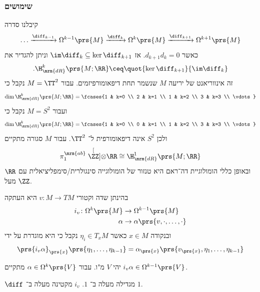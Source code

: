 \documentclass[a4paper,10pt,twoside,openany]{book}
\begin{document}
\subsubsection{שימושים}
קיבלנו סדרה
\[\ldots \xrightarrow{\diff_{k-1}} \Omega^{k-1}\prs{M} \xrightarrow{\diff_k} \Omega^k \prs{M} \xrightarrow{\diff_{k+1}} \Omega^{k+1}\prs{M}\]
כאשר
$d_{k+1} d_k = 0$.
אז
$\im \diff_k \subseteq \ker \diff_{k+1}$
וניתן להגדיר את
\[\text{.} \H_{\mrm{dR}}^k \prs{M ; \RR} \ceq \quot{\ker \diff_{k+1}}{\im \diff_k}\]
זה אינווריאנט של יריעה
$M$
שנשמר תחת דיפאומורפיזמים.
עבור
$M = \TT^2$
נקבל כי
\[\dim \H_{\mrm{dR}}^k \prs{M ; \RR} = \fcases{1 & k=0 \\ 2 & k=1 \\ 1 & k=2 \\ 3 & k=3 \\ \vdots}\]
ועבור
$M = S^2$
נקבל כי
\[\dim \H_{\mrm{dR}}^k \prs{M ; \RR} = \fcases{1 & k=0 \\ 0 & k=1 \\ 1 & k=2 \\ 3 & k=3 \\ \vdots}\]
ולכן
$S^2$
אינה דיפאומורפית ל־%
$\TT^2$.
עבור
$M$
סגורה מתקיים
\[\pi_1^{\mrm{ab}} \stackrel[\ZZ]{}{\otimes} \RR \cong \H^1_{\mrm{dR}} \prs{M ; \RR}\]
ובאופן כללי הומולוגיית דה־ראם היא טנזור של הומולוגייה סינגולרית/סימפליציאלית עם
$\RR$
מעל
$\ZZ$.

\begin{definition}
בהינתן שדה וקטורי
$v \colon M \to TM$
היא העתקה
\begin{align*}
i_v \colon \Omega^k \prs{M} &\to \Omega^{k-1}\prs{M} \\
\alpha &\to \alpha\prs{v, \cdot, \ldots, \cdot}
\end{align*}
ובנקודה
$x \in M$
כאשר
$\eta_i \in T_x M$
נקבל כי היא מוגדרת על ידי
\[\prs{i_v \alpha}_{\prs{x}} \prs{\eta_1, \ldots, \eta_{k-1}} = \alpha_{\prs{x}} \prs{v_{\prs{x}}, \eta_1, \ldots, \eta_{k-1}}\]
\end{definition}

\begin{example}
יהי
$V$
מ"ו. עבור
$\alpha \in \Omega^k\prs{V}$
מתקיים
$i_v \alpha \in \Omega^{k-1}\prs{V}$.
\end{example}

\begin{remark}
$\diff$
מגדילה מעלה ב־%
$1$.
$i_v$
מקטינה מעלה ב־%
$1$.
\end{remark}
\end{document}
